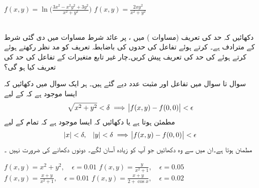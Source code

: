 $f(x,y)=\ln\big(\frac{3x^2-x^2y^2+3y^2}{x^2+y^2}\big)$
$f(x,y)=\frac{2xy^2}{x^2+y^2}$

\\
دکھائیں کہ حد کی تعریف  (مساوات ) میں   ،  پر عائد  شرط مساوات  میں دی گئی شرط کے مترادف ہے۔
 کرتے ہوئے تفاعل کی  حدوں کی باضابطہ  تعریف کو مد نظر رکھتے ہوئے   کرتے ہوئے  کی  حد کی تعریف پیش کریں۔چار غیر تابع متغیرات کے تفاعل  کی حد کی تعریف کیا ہو گی؟  

سوال  تا سوال  میں  تفاعل  اور مثبت عدد  دیے گئے ہیں۔ ہر ایک سوال میں دکھائیں کہ  ایسا  موجود ہے  کہ   کے لیے 
\begin{align*}
\sqrt{x^2+y^2}<\delta\implies \abs{f(x,y)-f(0,0)}<\epsilon
\end{align*}
مطمئن ہوتا ہے  یا دکھائیں کہ ایسا  موجود ہے کہ تمام  کے لیے
\begin{align*}
\abs{x}<\delta,\quad \abs{y}<\delta \implies \abs{f(x,y)-f(0,0)}<\epsilon
\end{align*}
مطمئن ہوتا ہے۔ان میں سے وہ دکھائیں  جو آپ کو زیادہ  آسان لگے۔ دونوں دکھانے  کی ضرورت نہیں ۔ 

$f(x,y)=x^2+y^2,\quad \epsilon=0.01$
$f(x,y)=\frac{y}{x^2+1},\quad \epsilon=0.05$
$f(x,y)=\frac{x+y}{x^2+1},\quad \epsilon=0.01$
$f(x,y)=\frac{x+y}{2+\cos x},\quad \epsilon=0.02$


